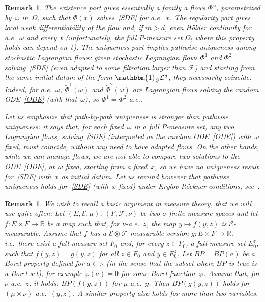 \documentclass[a4paper,10pt]{article}
\newtheorem{remark}[theorem]{Remark}
\newcommand\1{\mathbbm{1}}
\newcommand{\mr}{\mathbb{R}}
\newcommand{\mc}{\mathcal}
\newcommand{\td}{\tilde}
\numberwithin{equation}{section}
\begin{document}
\begin{remark}
The existence part gives essentially a family a flows $\Phi^\omega$, parametrized by~$\omega$ in~$\Omega$, such that $\Phi(x)$ solves~\eqref{SDE} for a.e.~$x$. The regularity part gives local weak differentiability of the flow and, if $m>d$, even H\"older continuity for a.e.~$\omega$ and every~$t$ \textup{(}unfortunately, the full $P$-measure set $\Omega_t$ where this property holds can depend on~$t$\textup{)}. The uniqueness part implies pathwise uniqueness among stochastic Lagrangian flows: given stochastic Lagrangian flows $\Phi^1$ and $\Phi^2$ solving~\eqref{SDE} \textup{(}even adapted to some filtration larger than $\mc{F}$\textup{)} and starting from the same initial datum of the form $ \1_{S} \mc{L}^d$, they necessarily coincide. Indeed, for a.e.~$\omega$, $\td{\Phi}^1(\omega)$ and $\td{\Phi}^2(\omega)$ are Lagrangian flows solving the random ODE~\eqref{ODE} \textup{(}with that~$\omega$\textup{)}, so $\Phi^1=\Phi^2$ a.e.. 

Let us emphasize that path-by-path uniqueness is stronger than pathwise uniqueness: it says that, for each fixed~$\omega$ 
in a full $P$-measure set, any two Lagrangian flows, solving~\eqref{SDE} \textup{(}interpreted as the random ODE~\eqref{ODE}\textup{)} with~$\omega$ fixed, must coincide, without any need to have adapted flows. On the other hands, while we can manage flows, we are not able to compare two solutions to the ODE~\eqref{ODE}, at~$\omega$ fixed, starting from a fixed~$x$, so we have no uniqueness result for~\eqref{SDE} with~$x$ as initial datum. Let us remind however that pathwise uniqueness holds for~\eqref{SDE} \textup{(}with~$x$ fixed\textup{)} under Krylov-R\"ockner conditions, see~\textup{\cite{KRYROE05}}.
\end{remark}

\begin{remark}\label{simple_rmk}
We wish to recall a basic argument in measure theory, that we will use quite often: Let $(E,\mathcal{E},\mu)$, $(F,\mathcal{F},\nu)$ be two $\sigma$-finite measure spaces and let $f \colon E\times F\rightarrow \mr$ be a map such that, for $\nu$-a.e.~$z$, the map $y \mapsto f(y,z)$ is $\mathcal{E}$-measurable. Assume that $f$ has a $\mathcal{E} \otimes \mathcal{F}$-measurable version $g \colon E\times F\rightarrow \mr$, i.e.~there exist a full measure set $F_0$ and, for every $z \in F_0$, a full measure set $E_0^z$, such that $f(y,z)=g(y,z)$ for all $z \in F_0$ and $y \in E_0^z$. Let $BP=BP(a)$ be a Borel property defined for $a\in\mr$ \textup{(}in the sense that the subset where $BP$ is true is a Borel set\textup{)}, for example $\varphi(a)=0$ for some Borel function~$\varphi$. Assume that, for $\nu$-a.e.~$z$, it holds: $BP(f(y,z))$ for $\mu$-a.e.~$y$. Then $BP(g(y,z))$ holds for $(\mu \times \nu)$-a.e.~$(y,z)$. A similar property also holds for more than two variables.
\end{remark}
\end{document}

